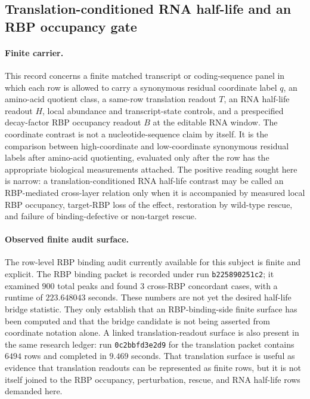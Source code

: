 
\subsection{Translation-conditioned RNA half-life and an RBP occupancy gate}
\label{sec:bior-reality-q6-rna-half-life-rbp-bridge}

\paragraph{Finite carrier.}
This record concerns a finite matched transcript or coding-sequence panel in which each row is allowed to carry a synonymous residual coordinate label $q$, an amino-acid quotient class, a same-row translation readout $T$, an RNA half-life readout $H$, local abundance and transcript-state controls, and a prespecified decay-factor RBP occupancy readout $B$ at the editable RNA window. The coordinate contrast is not a nucleotide-sequence claim by itself. It is the comparison between high-coordinate and low-coordinate synonymous residual labels after amino-acid quotienting, evaluated only after the row has the appropriate biological measurements attached. The positive reading sought here is narrow: a translation-conditioned RNA half-life contrast may be called an RBP-mediated cross-layer relation only when it is accompanied by measured local RBP occupancy, target-RBP loss of the effect, restoration by wild-type rescue, and failure of binding-defective or non-target rescue.

\paragraph{Observed finite audit surface.}
The row-level RBP binding audit currently available for this subject is finite and explicit. The RBP binding packet is recorded under run \texttt{b225890251c2}; it examined $900$ total peaks and found $3$ cross-RBP concordant cases, with a runtime of $223.648043$ seconds. These numbers are not yet the desired half-life bridge statistic. They only establish that an RBP-binding-side finite surface has been computed and that the bridge candidate is not being asserted from coordinate notation alone. A linked translation-readout surface is also present in the same research ledger: run \texttt{0c2bbfd3e2d9} for the translation packet contains $6494$ rows and completed in $9.469$ seconds. That translation surface is useful as evidence that translation readouts can be represented as finite rows, but it is not itself joined to the RBP occupancy, perturbation, rescue, and RNA half-life rows demanded here.

